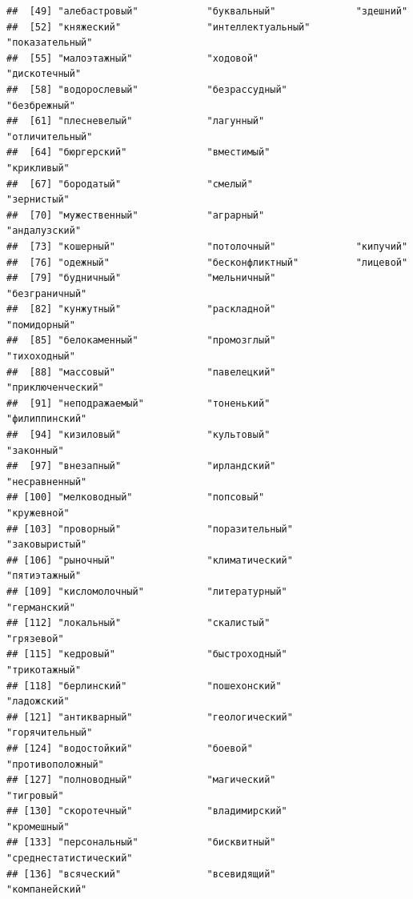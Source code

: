 \documentclass[11pt]{article}\usepackage[]{graphicx}\usepackage[]{color}
\makeatletter
\newenvironment{kframe}{%
 \def\at@end@of@kframe{}%
 \ifinner\ifhmode%
  \def\at@end@of@kframe{\end{minipage}}%
  \begin{minipage}{\columnwidth}%
 \fi\fi%
 \def\FrameCommand##1{\hskip\@totalleftmargin \hskip-\fboxsep
 \colorbox{shadecolor}{##1}\hskip-\fboxsep
     \hskip-\linewidth \hskip-\@totalleftmargin \hskip\columnwidth}%
 \MakeFramed {\advance\hsize-\width
   \@totalleftmargin\z@ \linewidth\hsize
   \@setminipage}}%
 {\par\unskip\endMakeFramed%
 \at@end@of@kframe}
\newenvironment{knitrout}{}{} %
\makeatother
\begin{document}
\begin{knitrout}
\begin{kframe}
\begin{verbatim}
##  [49] "алебастровый"            "буквальный"              "здешний"                
##  [52] "княжеский"               "интеллектуальный"        "показательный"          
##  [55] "малоэтажный"             "ходовой"                 "дискотечный"            
##  [58] "водорослевый"            "безрассудный"            "безбрежный"             
##  [61] "плесневелый"             "лагунный"                "отличительный"          
##  [64] "бюргерский"              "вместимый"               "крикливый"              
##  [67] "бородатый"               "смелый"                  "зернистый"              
##  [70] "мужественный"            "аграрный"                "андалузский"            
##  [73] "кошерный"                "потолочный"              "кипучий"                
##  [76] "одежный"                 "бесконфликтный"          "лицевой"                
##  [79] "будничный"               "мельничный"              "безграничный"           
##  [82] "кунжутный"               "раскладной"              "помидорный"             
##  [85] "белокаменный"            "промозглый"              "тихоходный"             
##  [88] "массовый"                "павелецкий"              "приключенческий"        
##  [91] "неподражаемый"           "тоненький"               "филиппинский"           
##  [94] "кизиловый"               "культовый"               "законный"               
##  [97] "внезапный"               "ирландский"              "несравненный"           
## [100] "мелководный"             "попсовый"                "кружевной"              
## [103] "проворный"               "поразительный"           "заковыристый"           
## [106] "рыночный"                "климатический"           "пятиэтажный"            
## [109] "кисломолочный"           "литературный"            "германский"             
## [112] "локальный"               "скалистый"               "грязевой"               
## [115] "кедровый"                "быстроходный"            "трикотажный"            
## [118] "берлинский"              "пошехонский"             "ладожский"              
## [121] "антикварный"             "геологический"           "горячительный"          
## [124] "водостойкий"             "боевой"                  "противоположный"        
## [127] "полноводный"             "магический"              "тигровый"               
## [130] "скоротечный"             "владимирский"            "кромешный"              
## [133] "персональный"            "бисквитный"              "среднестатистический"   
## [136] "всяческий"               "всевидящий"              "компанейский"           

\end{verbatim}
\end{kframe}
\end{knitrout}
\end{document}
